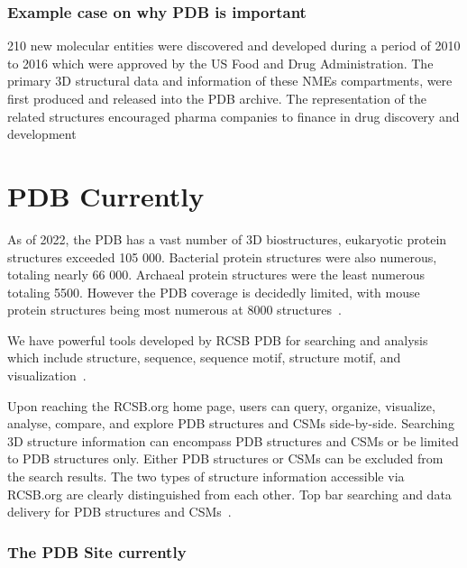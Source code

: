 \documentclass{report}
\begin{document}
\subsubsection{Example case on why PDB is important}

210 new molecular entities were discovered and developed during a period of 2010 to 2016 which were approved by the US Food and Drug Administration. The primary 3D structural data and information of these NMEs compartments, were first produced and released into the PDB archive. The representation of the related structures encouraged pharma companies to finance in drug discovery and development~\cite{westbrook_impact_2020}~\cite{westbrook_how_2019}~\cite{behzadi_worldwide_2021}

\section{PDB Currently}

As of 2022, the PDB has a vast number of 3D biostructures, eukaryotic protein structures exceeded 105 000. Bacterial protein structures were also numerous, totaling nearly 66 000. Archaeal protein structures were the least numerous totaling 5500. However the PDB coverage is decidedly limited, with mouse protein structures being most numerous at 8000 structures~\cite{burley_open-access_2021}. 

We have powerful tools developed by RCSB PDB for searching and analysis which include structure, sequence, sequence motif, structure motif, and visualization~\cite{burley1_rcsb_2022}.

Upon reaching the RCSB.org home page, users can query, organize, visualize, analyse, compare, and explore PDB structures and CSMs side-by-side. Searching 3D structure information can encompass PDB structures and CSMs or be limited to PDB structures only. Either PDB structures or CSMs can be excluded from the search results. The two types of structure information accessible via RCSB.org are clearly distinguished from each other. Top bar searching and data delivery for PDB structures and CSMs~\cite{burley1_rcsb_2022}.

\subsubsection{The PDB Site currently}
\end{document}
